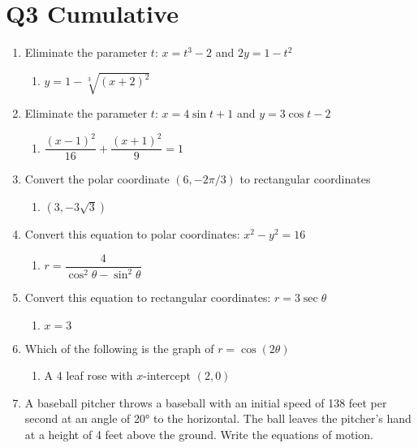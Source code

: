 \documentclass[
]{article}
\author{}
\date{}
\providecommand{\tightlist}{%
  \setlength{\itemsep}{0pt}\setlength{\parskip}{0pt}}
\begin{document}
\section{Q3 Cumulative}\label{q3-cumulative}

\begin{enumerate}
\def\labelenumi{\arabic{enumi}.}
\tightlist
\item
  Eliminate the parameter \(t\): \(x=t^3-2\) and \(2y=1-t^2\)

  \begin{enumerate}
  \def\labelenumii{\Alph{enumii}.}
  \tightlist
  \item
    \(y = 1 - \sqrt[3]{(x+2)^{2}}\)
  \end{enumerate}
\item
  Eliminate the parameter \(t\): \(x = 4 \sin t + 1\) and
  \(y = 3 \cos t - 2\)

  \begin{enumerate}
  \def\labelenumii{\Alph{enumii}.}
  \tightlist
  \item
    \(\dfrac{(x-1)^2}{16} + \dfrac{(x+1)^2}{9} = 1\)
  \end{enumerate}
\item
  Convert the polar coordinate \((6,-2\pi/3)\) to rectangular
  coordinates

  \begin{enumerate}
  \def\labelenumii{\Alph{enumii}.}
  \tightlist
  \item
    \((3, -3\sqrt3)\)
  \end{enumerate}
\item
  Convert this equation to polar coordinates: \(x^2-y^2 = 16\)

  \begin{enumerate}
  \def\labelenumii{\Alph{enumii}.}
  \tightlist
  \item
    \(r = \dfrac{4}{\cos^2 \theta - \sin^2 \theta}\)
  \end{enumerate}
\item
  Convert this equation to rectangular coordinates:
  \(r = 3 \sec \theta\)

  \begin{enumerate}
  \def\labelenumii{\Alph{enumii}.}
  \tightlist
  \item
    \(x = 3\)
  \end{enumerate}
\item
  Which of the following is the graph of \(r = \cos(2\theta)\)

  \begin{enumerate}
  \def\labelenumii{\Alph{enumii}.}
  \tightlist
  \item
    A 4 leaf rose with \(x\)-intercept \((2,0)\)
  \end{enumerate}
\setlength\itemsep{6em}
\item
  A baseball pitcher throws a baseball with an initial speed of 138 feet
  per second at an angle of 20° to the horizontal. The ball leaves the
  pitcher's hand at a height of 4 feet above the ground. Write the
  equations of motion.


\end{enumerate}
\end{document}
